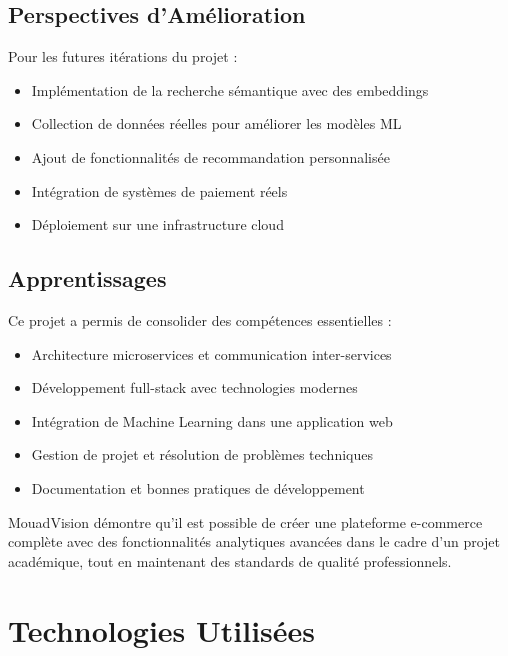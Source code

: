\documentclass[12pt,a4paper]{report}
\begin{document}
\section*{Perspectives d'Amélioration}

Pour les futures itérations du projet :

\begin{itemize}[noitemsep]
    \item Implémentation de la recherche sémantique avec des embeddings
    \item Collection de données réelles pour améliorer les modèles ML
    \item Ajout de fonctionnalités de recommandation personnalisée
    \item Intégration de systèmes de paiement réels
    \item Déploiement sur une infrastructure cloud
\end{itemize}

\section*{Apprentissages}

Ce projet a permis de consolider des compétences essentielles :

\begin{itemize}[noitemsep]
    \item Architecture microservices et communication inter-services
    \item Développement full-stack avec technologies modernes
    \item Intégration de Machine Learning dans une application web
    \item Gestion de projet et résolution de problèmes techniques
    \item Documentation et bonnes pratiques de développement
\end{itemize}

MouadVision démontre qu'il est possible de créer une plateforme e-commerce complète avec des fonctionnalités analytiques avancées dans le cadre d'un projet académique, tout en maintenant des standards de qualité professionnels.

\appendix

\chapter{Technologies Utilisées}
\end{document}
